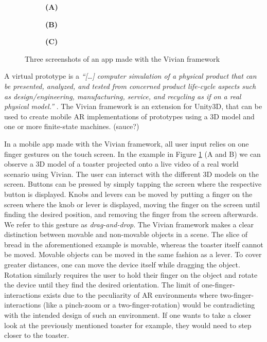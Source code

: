 \documentclass[11pt, a4paper]{article}
\begin{document}
\begin{figure}[H]
			\begin{subfigure}[t]{.32\textwidth}\centering
				\textbf{(A)}
			\end{subfigure}
			\begin{subfigure}[t]{.32\textwidth}\centering
				\textbf{(B)}
			\end{subfigure}
			\begin{subfigure}[t]{.32\textwidth}\centering
				\textbf{(C)}
			\end{subfigure}
			\caption{Three screenshots of an app made with the Vivian framework}
			\label{fig:feedbackonphone}
		\end{figure}

		A virtual prototype is a \textit{``\textnormal{[…]} computer simulation of a physical product that can be presented, analyzed, and tested from concerned product life-cycle aspects such as design/engineering, manufacturing, service, and recycling as if on a real physical model.''} \cite{Wang2002}. The Vivian framework is an extension for Unity3D, that can be used to create mobile \ac{AR} implementations of prototypes using a 3D model and one or more finite-state machines. (sauce?)

		In a mobile app made with the Vivian framework, all user input relies on one finger gestures on the touch screen. In the example in Figure \ref{fig:feedbackonphone} (A and B) we can observe a 3D model of a toaster projected onto a live video of a real world scenario using Vivian. The user can interact with the different 3D models on the screen. Buttons can be pressed by simply tapping the screen where the respective button is displayed. Knobs and levers can be moved by putting a finger on the screen where the knob or lever is displayed, moving the finger on the screen until finding the desired position, and removing the finger from the screen afterwards. We refer to this gesture as \emph{drag-and-drop}. The Vivian framework makes a clear distinction between movable and non-movable objects in a scene. The slice of bread in the aforementioned example is movable, whereas the toaster itself cannot be moved. Movable objects can be moved in the same fashion as a lever. To cover greater distances, one can move the device itself while dragging the object. Rotation similarly requires the user to hold their finger on the object and rotate the device until they find the desired orientation. The limit of one-finger-interactions exists due to the peculiarity of \ac{AR} environments where two-finger-interactions (like a pinch-zoom or a two-finger-rotation) would be contradicting with the intended design of such an environment. If one wants to take a closer look at the previously mentioned toaster for example, they would need to step closer to the toaster.
\end{document}
